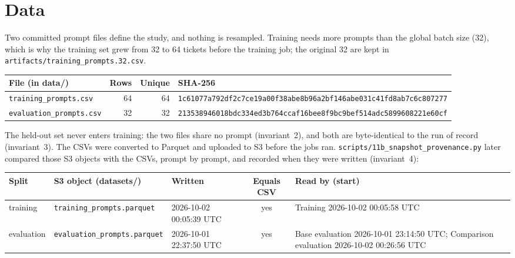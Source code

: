 \documentclass[11pt]{article}
\begin{document}
\section{Data}
Two committed prompt files define the study, and nothing is resampled. Training needs more prompts than the
global batch size (32), which is why the training set grew from 32 to 64 tickets before the
training job; the original 32 are kept in \texttt{artifacts/training\_prompts.32.csv}.
{\small
\begin{center}
\begin{minipage}{\linewidth}\centering
\begin{tabular}{lrrl}
\toprule
\textbf{File (in data/)} & \textbf{Rows} & \textbf{Unique} & \textbf{SHA-256} \\
\midrule
\texttt{training\_prompts.csv} & 64 & 64 & \texttt{\scriptsize 1c61077a792df2c7ce19a00f38abe8b96a2bf146abe031c41fd8ab7c6c807277} \\
\texttt{evaluation\_prompts.csv} & 32 & 32 & \texttt{\scriptsize 213538946018bdc334ed3b764ccaf16bee8f9bc9bef514adc5899608221e60cf} \\
\bottomrule
\end{tabular}
\end{minipage}
\end{center}
}
The held-out set never enters training: the two files share no prompt (invariant~2), and both
are byte-identical to the run of record (invariant~3). The CSVs were converted to Parquet
and uploaded to S3 before the jobs ran. \texttt{scripts/11b\_snapshot\_provenance.py} later compared those S3
objects with the CSVs, prompt by prompt, and recorded when they were written
(invariant~4):
{\small
\begin{center}
\begin{minipage}{\linewidth}\centering
\begin{tabular}{lP{4.8cm}P{2.3cm}cP{4.1cm}}
\toprule
\textbf{Split} & \textbf{S3 object (datasets/)} & \textbf{Written} & \textbf{Equals CSV} & \textbf{Read by (start)} \\
\midrule
training & \texttt{training\_prompts.parquet} & 2026-10-02 00:05:39 UTC & yes & Training 2026-10-02 00:05:58 UTC \\
evaluation & \texttt{evaluation\_prompts.parquet} & 2026-10-01 22:37:50 UTC & yes & Base evaluation 2026-10-01 23:14:50 UTC; Comparison evaluation 2026-10-02 00:26:56 UTC \\
\bottomrule
\end{tabular}
\end{minipage}
\end{center}
}
\end{document}

